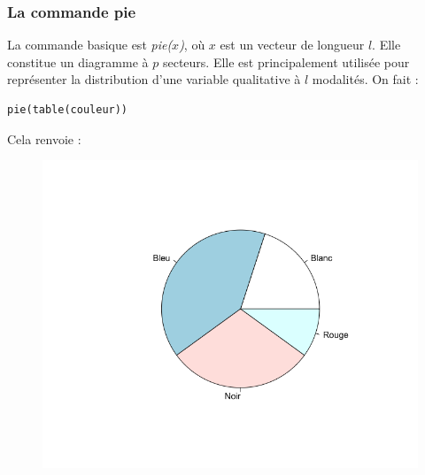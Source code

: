 \subsubsection{La commande pie}
La commande basique est \textit{pie($x$)}, où $x$ est un vecteur de longueur $l$. Elle constitue un diagramme à $p$ secteurs. Elle est principalement utilisée pour représenter la distribution d'une variable qualitative à $l$ modalités.\newline
On fait :
\begin{lstlisting}[language=html]
pie(table(couleur))
\end{lstlisting}
Cela renvoie :
\begin{figure}[H]\begin{center}\includegraphics[scale=0.4]{ilu/gra41.png}\end{center}\end{figure}
